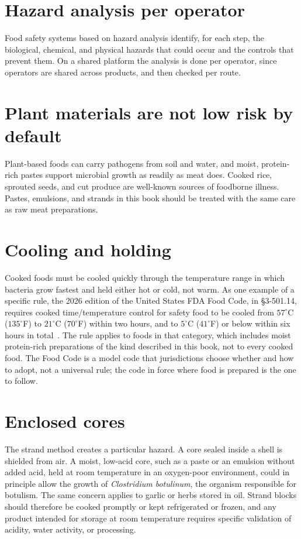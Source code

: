 \documentclass[11pt,openany]{book}
\theoremstyle{definition}
\begin{document}
\section{Hazard analysis per operator}

Food safety systems based on hazard analysis identify, for each step, the biological, chemical, and physical hazards that could occur and the controls that prevent them. On a shared platform the analysis is done per operator, since operators are shared across products, and then checked per route.

\section{Plant materials are not low risk by default}

Plant-based foods can carry pathogens from soil and water, and moist, protein-rich pastes support microbial growth as readily as meat does. Cooked rice, sprouted seeds, and cut produce are well-known sources of foodborne illness. Pastes, emulsions, and strands in this book should be treated with the same care as raw meat preparations.

\section{Cooling and holding}

Cooked foods must be cooled quickly through the temperature range in which bacteria grow fastest and held either hot or cold, not warm. As one example of a specific rule, the 2026 edition of the United States FDA Food Code, in \S3-501.14, requires cooked time/temperature control for safety food to be cooled from $57^\circ$C ($135^\circ$F) to $21^\circ$C ($70^\circ$F) within two hours, and to $5^\circ$C ($41^\circ$F) or below within six hours in total~\cite{foodcode2026}. The rule applies to foods in that category, which includes moist protein-rich preparations of the kind described in this book, not to every cooked food. The Food Code is a model code that jurisdictions choose whether and how to adopt, not a universal rule; the code in force where food is prepared is the one to follow.

\section{Enclosed cores}

The strand method creates a particular hazard. A core sealed inside a shell is shielded from air. A moist, low-acid core, such as a paste or an emulsion without added acid, held at room temperature in an oxygen-poor environment, could in principle allow the growth of \emph{Clostridium botulinum}, the organism responsible for botulism. The same concern applies to garlic or herbs stored in oil. Strand blocks should therefore be cooked promptly or kept refrigerated or frozen, and any product intended for storage at room temperature requires specific validation of acidity, water activity, or processing.
\end{document}
